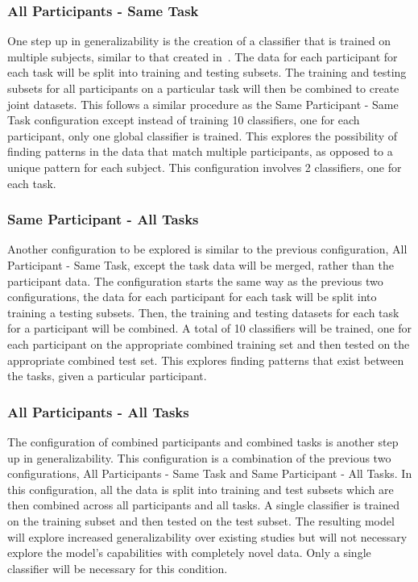 \documentclass[11pt]{article}
\begin{document}
\subsubsection{All Participants - Same Task}
One step up in generalizability is the creation of a classifier that is trained on multiple subjects, similar to that created in~\cite{Wang_Z}. The data for each participant for each task will be split into training and testing subsets. The training and testing subsets for all participants on a particular task will then be combined to create joint datasets. This follows a similar procedure as the Same Participant - Same Task configuration except instead of training 10 classifiers, one for each participant, only one global classifier is trained. This explores the possibility of finding patterns in the data that match multiple participants, as opposed to a unique pattern for each subject. This configuration involves 2 classifiers, one for each task.


\subsubsection{Same Participant - All Tasks}
Another configuration to be explored is similar to the previous configuration, All Participant - Same Task, except the task data will be merged, rather than the participant data. The configuration starts the same way as the previous two configurations, the data for each participant for each task will be split into training a testing subsets. Then, the training and testing datasets for each task for a participant will be combined. A total of 10 classifiers will be trained, one for each participant on the appropriate combined training set and then tested on the appropriate combined test set. This explores finding patterns that exist between the tasks, given a particular participant.

\subsubsection{All Participants - All Tasks}
The configuration of combined participants and combined tasks is another step up in generalizability. This configuration is a combination of the previous two configurations, All Participants - Same Task and Same Participant - All Tasks. In this configuration, all the data is split into training and test subsets which are then combined across all participants and all tasks. A single classifier is trained on the training subset and then tested on the test subset. The resulting model will explore increased generalizability over existing studies but will not necessary explore the model's capabilities with completely novel data. Only a single classifier will be necessary for this condition.
\end{document}
